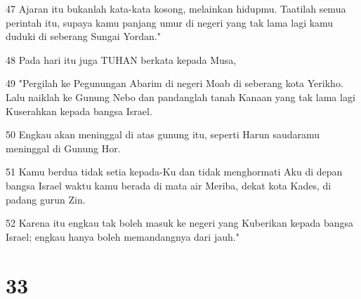 \par 47 Ajaran itu bukanlah kata-kata kosong, melainkan hidupmu. Taatilah semua perintah itu, supaya kamu panjang umur di negeri yang tak lama lagi kamu duduki di seberang Sungai Yordan."
\par 48 Pada hari itu juga TUHAN berkata kepada Musa,
\par 49 "Pergilah ke Pegunungan Abarim di negeri Moab di seberang kota Yerikho. Lalu naiklah ke Gunung Nebo dan pandanglah tanah Kanaan yang tak lama lagi Kuserahkan kepada bangsa Israel.
\par 50 Engkau akan meninggal di atas gunung itu, seperti Harun saudaramu meninggal di Gunung Hor.
\par 51 Kamu berdua tidak setia kepada-Ku dan tidak menghormati Aku di depan bangsa Israel waktu kamu berada di mata air Meriba, dekat kota Kades, di padang gurun Zin.
\par 52 Karena itu engkau tak boleh masuk ke negeri yang Kuberikan kepada bangsa Israel; engkau hanya boleh memandangnya dari jauh."

\chapter{33}

